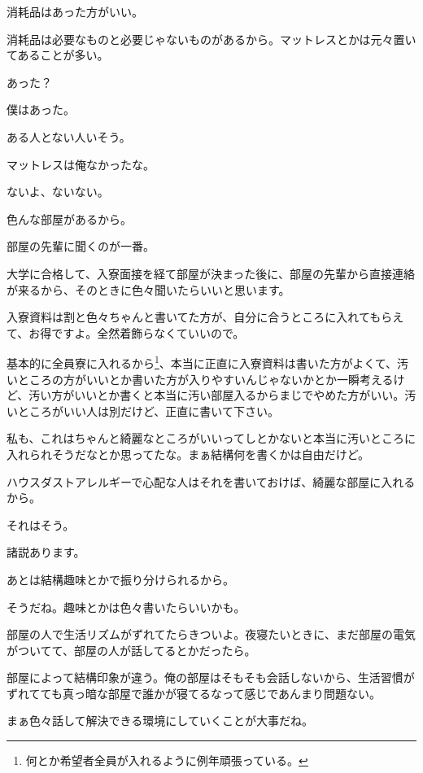 \begin{multicols}{2}
消耗品はあった方がいい。

消耗品は必要なものと必要じゃないものがあるから。マットレスとかは元々置いてあることが多い。

あった？

僕はあった。

ある人とない人いそう。

マットレスは俺なかったな。

ないよ、ないない。

色んな部屋があるから。

部屋の先輩に聞くのが一番。

大学に合格して、入寮面接を経て部屋が決まった後に、部屋の先輩から直接連絡が来るから、そのときに色々聞いたらいいと思います。

入寮資料は割と色々ちゃんと書いてた方が、自分に合うところに入れてもらえて、お得ですよ。全然着飾らなくていいので。

基本的に全員寮に入れるから\footnote{何とか希望者全員が入れるように例年頑張っている。}、本当に正直に入寮資料は書いた方がよくて、汚いところの方がいいとか書いた方が入りやすいんじゃないかとか一瞬考えるけど、汚い方がいいとか書くと本当に汚い部屋入るからまじでやめた方がいい。汚いところがいい人は別だけど、正直に書いて下さい。

私も、これはちゃんと綺麗なところがいいってしとかないと本当に汚いところに入れられそうだなとか思ってたな。まぁ結構何を書くかは自由だけど。

ハウスダストアレルギーで心配な人はそれを書いておけば、綺麗な部屋に入れるから。

それはそう。

諸説あります。

あとは結構趣味とかで振り分けられるから。

そうだね。趣味とかは色々書いたらいいかも。

部屋の人で生活リズムがずれてたらきついよ。夜寝たいときに、まだ部屋の電気がついてて、部屋の人が話してるとかだったら。

部屋によって結構印象が違う。俺の部屋はそもそも会話しないから、生活習慣がずれてても真っ暗な部屋で誰かが寝てるなって感じであんまり問題ない。

まぁ色々話して解決できる環境にしていくことが大事だね。


\end{multicols}
